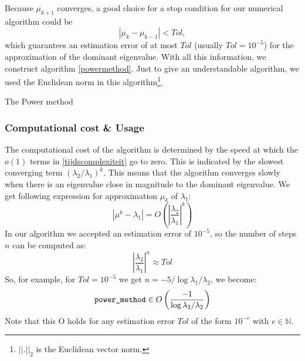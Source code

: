 \documentclass[a4paper,11pt]{report}
\newcommand{\N}{{\mathbb N}}
\begin{document}
Because $\mu_{k+1}$ converges, a good choice for a stop condition for our numerical algorithm could be 
$$|\mu_k - \mu_{k-1}| < Tol,$$
which guarantees an estimation error of at most $Tol$ (usually $Tol=10^{-5}$) for the approximation of the dominant eigenvalue. With all this information, we construct algorithm \ref{powermethod}. Just to give an understandable algorithm, we 
used the Euclidean norm in this algorithm\footnote{$||.||_2$ is the Euclidean vector norm.}. 


\begin{algorithm}[H]
 \blankline
{}

 
 \caption{The Power method}\label{powermethod}
\end{algorithm}

\subsubsection{Computational cost \& Usage}
The computational cost of the algorithm is determined by the speed at which the 
$o(1)$ terms in \ref{tijdscomplexiteit} go to zero. This is indicated by the slowest converging term $(\lambda_2/\lambda_1)^k$. This means
that  the algorithm converges slowly when there is an eigenvalue close in magnitude to the dominant eigenvalue. We 
get following expression for approximation $\mu_k$ of $\lambda_1$:
$$|\mu^k - \lambda_1| = O\left(\left|\frac{\lambda_2}{\lambda_1} \right|^k\right)$$
In our algorithm we accepted an estimation error of $10^{-5}$, so the number of 
steps $n$ can be computed as:
$$\left|\frac{\lambda_2}{\lambda_1} \right|^n \approx Tol$$
So, for example, for $Tol = 10^{-5}$ we get $n = -5/\log{\lambda_1/\lambda_2}$, we become:
$$\text{\texttt{power\_method}} \in O\left(\frac{-1}{\log{\lambda_2/\lambda_2}}\right)$$
Note that this O holds for any estimation error $Tol$ of the form $10^{-e}$ with $e \in \N$. 
\end{document}
